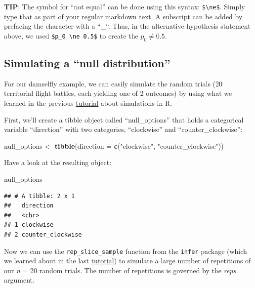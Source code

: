 \documentclass[
]{book}
\newenvironment{Shaded}{\begin{snugshade}}{\end{snugshade}}
\newcommand{\AttributeTok}[1]{\textcolor[rgb]{0.13,0.29,0.53}{#1}}
\newcommand{\FunctionTok}[1]{\textcolor[rgb]{0.13,0.29,0.53}{\textbf{#1}}}
\newcommand{\NormalTok}[1]{#1}
\newcommand{\OtherTok}[1]{\textcolor[rgb]{0.56,0.35,0.01}{#1}}
\newcommand{\StringTok}[1]{\textcolor[rgb]{0.31,0.60,0.02}{#1}}
\begin{document}
\textbf{TIP}:
The symbol for ``not equal'' can be done using this syntax: \texttt{\$\textbackslash{}ne\$}. Simply type that as part of your regular markdown text. A subscript can be added by prefacing the character with a ``\_``. Thus, in the alternative hypothesis statement above, we used \texttt{\$p\_0\ \textbackslash{}ne\ 0.5\$} to create the \(p_0 \ne 0.5\).

\subsection{Simulating a ``null distribution''}\label{sim_null}

For our damselfly example, we can easily simulate the random trials (20 territorial flight battles, each yielding one of 2 outcomes) by using what we learned in the previous \hyperref[estimation]{tutorial} about simulations in R.

First, we'll create a tibble object called ``null\_options'' that holds a categorical variable ``direction'' with two categories, ``clockwise'' and ``counter\_clockwise'':

\begin{Shaded}
\begin{Highlighting}[]
\NormalTok{null\_options }\OtherTok{\textless{}{-}} \FunctionTok{tibble}\NormalTok{(}\AttributeTok{direction =} \FunctionTok{c}\NormalTok{(}\StringTok{"clockwise"}\NormalTok{, }\StringTok{"counter\_clockwise"}\NormalTok{))}
\end{Highlighting}
\end{Shaded}

Have a look at the resulting object:

\begin{Shaded}
\begin{Highlighting}[]
\NormalTok{null\_options}
\end{Highlighting}
\end{Shaded}

\begin{verbatim}
## # A tibble: 2 x 1
##   direction        
##   <chr>            
## 1 clockwise        
## 2 counter_clockwise
\end{verbatim}

Now we can use the \texttt{rep\_slice\_sample} function from the \texttt{infer} package (which we learned about in the last \hyperref[estimation]{tutorial}) to simulate a large number of repetitions of our \emph{n} = 20 random trials. The number of repetitions is governed by the \emph{reps} argument.
\end{document}
